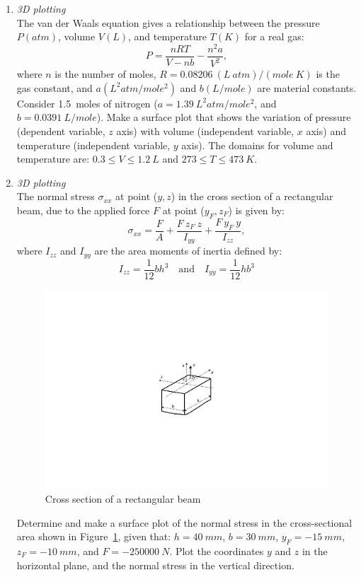 \begin{enumerate}
\item \textit{3D plotting}\\
The van der Waals equation gives a relationship between the pressure $P (atm)$, volume $V (L)$, and temperature $T (K)$ for a real gas: 
\begin{equation*}
P = \frac{nRT}{V-nb} - \frac{n^2a}{V^2},
\end{equation*}
where $n$ is the number of moles, $R = 0.08206~(L~atm)/(mole~K)$ is the gas constant, and $a (L^2atm/mole^2)$ and $b (L/mole)$ are material constants. Consider 1.5~moles of nitrogen ($a=1.39~L^2atm/mole^2$, and $b=0.0391~L/mole$). Make a \threed surface plot that shows the variation of pressure (dependent variable, $z$ axis) with volume (independent variable, $x$ axis) and temperature (independent variable, $y$ axis). The domains for volume and temperature are: $0.3 \leq V \leq 1.2~L$ and $273 \leq T \leq 473~K$.

\item \textit{3D plotting}\\
The normal stress $\sigma_{xx}$ at point ($y,z$) in the cross section of a rectangular beam, due to the applied force $F$ at point ($y_F,z_F$) is given by:
\begin{equation*}
\sigma_{xx} = \frac{F}{A} + \frac{F~z_F~z}{I_{yy}} + \frac{F~y_F~y}{I_{zz}},
\end{equation*}
where $I_{zz}$ and $I_{yy}$ are the area moments of inertia defined by:
\begin{equation*}
I_{zz} = \frac{1}{12} bh^3 \quad \textrm{and} \quad I_{yy} = \frac{1}{12}hb^3
\end{equation*}
\begin{figure}[h]
	\myfloatalign
	\includegraphics[width=0.45\linewidth]{Graphics/Additional-Ex/beam-stress}
	\caption{Cross section of a rectangular beam}
	\label{fig:beam-stress}
\end{figure}
Determine and make a \threed surface plot of the normal stress in the cross-sectional area shown in Figure~\ref{fig:beam-stress}, given that: $h=40~mm$, $b=30~mm$, $y_F=-15~mm$, $z_F=-10~mm$, and $F=-250000~N$. Plot the coordinates $y$ and $z$ in the horizontal plane, and the normal stress in the vertical direction.


\end{enumerate}
